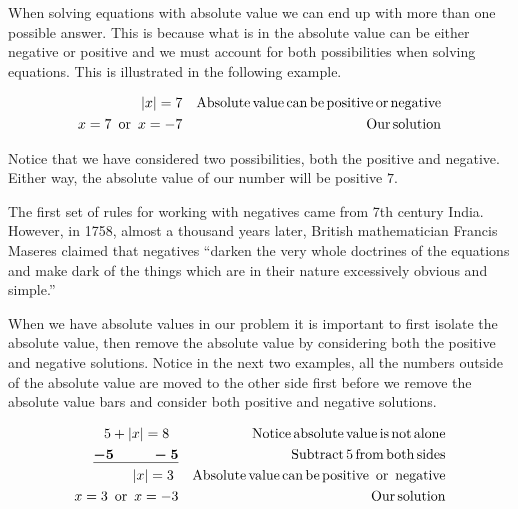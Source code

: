 {}\pp

 When solving equations with absolute value we can end up with more than one
possible answer. This is because what is in the absolute value can be either
negative or positive and we must account for both possibilities when solving
equations. This is illustrated in the following example.

\begin{example}\label{Lin34}
  
  \begin{eqnarray*}
    |x| = 7 &  & \operatorname{Absolute} \operatorname{value} \operatorname{can} \operatorname{be}
    \operatorname{positive} \operatorname{or} \operatorname{negative}\\
    x = 7 \operatorname{~or~} x = - 7 &  & \operatorname{Our} \operatorname{solution}
  \end{eqnarray*}
\end{example}

   Notice that we have considered two possibilities, both the positive and
  negative. Either way, the absolute value of our number will be positive $7$.\pp

 {} The first set of rules for working with
negatives came from 7th century India. However, in 1758, almost a thousand
years later, British mathematician Francis Maseres claimed that negatives
``darken the very whole doctrines of the equations and make dark of the things
which are in their nature excessively obvious and simple.''\pp

 When we have absolute values in our problem it is important to first isolate
the absolute value, then remove the absolute value by considering both the
positive and negative solutions. Notice in the next two examples, all the
numbers outside of the absolute value are moved to the other side first before
we remove the absolute value bars and consider both positive and negative
solutions.

\begin{example}\label{Lin35}
  \begin{eqnarray*}
    5 + |x| = 8~~ &  & \operatorname{Notice} \operatorname{absolute} \operatorname{value} \operatorname{is}
    \operatorname{not} \operatorname{alone}\\
    \boldsymbol{\underline{- 5 ~~~~~~~~- 5}} &  & \operatorname{Subtract} 5 \operatorname{from}
    \operatorname{both} \operatorname{sides}\\
    |x| = 3~ &  & \operatorname{Absolute} \operatorname{value} \operatorname{can} \operatorname{be}
    \operatorname{positive} \operatorname{~or~} \operatorname{negative}\\
    x = 3 \operatorname{~or~} x = - 3 &  & \operatorname{Our} \operatorname{solution}
  \end{eqnarray*}
\end{example}

